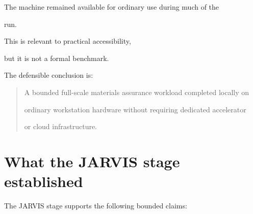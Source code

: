 \documentclass[11pt,a4paper,oneside]{report}
\begin{document}
The machine remained available for ordinary use during much of the

run.



This is relevant to practical accessibility,

but it is not a formal benchmark.



The defensible conclusion is:



\begin{quote}



A bounded full-scale materials assurance workload completed locally on

ordinary workstation hardware without requiring dedicated accelerator

or cloud infrastructure.



\end{quote}





\section{What the JARVIS stage established}



The JARVIS stage supports the following bounded claims:
\end{document}
